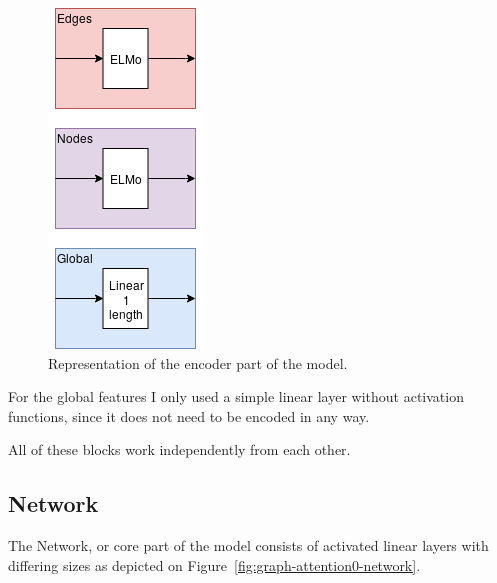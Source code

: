 \begin{figure}[!ht]
	\centering
	\includegraphics[scale=0.5]{figures/GA0_encoder.png}
	\caption{Representation of the encoder part of the model.}
	\label{fig:graph-attention0-encoder}
\end{figure}

For the global features I only used a simple linear layer without activation functions, since it does not need to be encoded in any way.

All of these blocks work independently from each other.

\subsection{Network}

The Network, or core part of the model consists of activated linear layers with differing sizes as depicted on Figure~\ref{fig:graph-attention0-network}.

